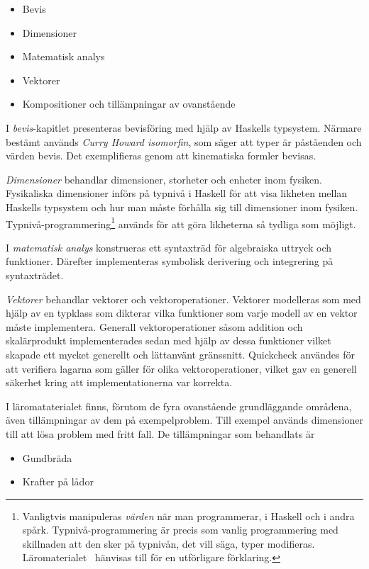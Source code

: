 \begin{draft}
\begin{itemize}
  \item Bevis
  \item Dimensioner
  \item Matematisk analys
  \item Vektorer
  \item Kompositioner och tillämpningar av ovanstående
\end{itemize}

I \textit{bevis}-kapitlet presenteras bevisföring med hjälp av Haskells
typsystem. Närmare bestämt används \textit{Curry Howard isomorfin}, som säger
att typer är påståenden och värden bevis.\cite{chi} Det exemplifieras genom att
kinematiska formler bevisas. 

\textit{Dimensioner} behandlar dimensioner, storheter och enheter inom fysiken.
Fysikaliska dimensioner införs på typnivå i Haskell för att visa likheten mellan
Haskells typsystem och hur man måste förhålla sig till dimensioner inom fysiken.
Typnivå-programmering\footnote{Vanligtvis manipuleras \textit{värden} när man
programmerar, i Haskell och i andra spårk. Typnivå-programmering är precis som
vanlig programmering med skillnaden att den sker på typnivån, det vill säga,
typer modifieras. Läromaterialet~\cite{LYAP} hänvisas till för en utförligare
förklaring.} används för att göra likheterna så tydliga som möjligt.

I \textit{matematisk analys} konstrueras ett syntaxträd för algebraiska uttryck
och funktioner. Därefter implementeras symbolisk derivering och integrering på
syntaxträdet.

\textit{Vektorer} behandlar vektorer och vektoroperationer. Vektorer modelleras
som med hjälp av en typklass som dikterar vilka funktioner som varje
modell av en vektor måste implementera. Generall vektoroperationer såsom
addition och skalärprodukt implementerades sedan med hjälp av dessa funktioner
vilket skapade ett mycket generellt och lättanvänt gränssnitt. Quickcheck
användes för att verifiera lagarna som gäller för olika vektoroperationer,
vilket gav en generell säkerhet kring att implementationerna var korrekta.

I läromataterialet finns, förutom de fyra ovanstående grundläggande områdena,
även tillämpningar av dem på exempelproblem. Till exempel används dimensioner
till att lösa problem med fritt fall. De tillämpningar som behandlats är

\begin{itemize}
  \item Gundbräda
  \item Krafter på lådor
\end{itemize}


\end{draft}
